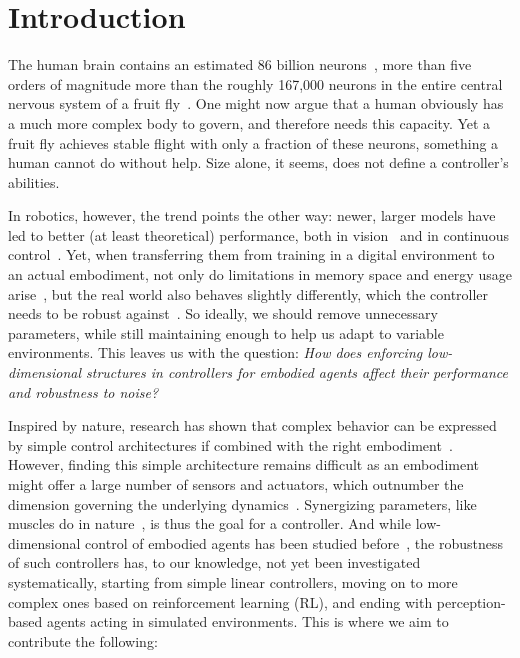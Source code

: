 \chapter{Introduction}
\label{chap:introduction}

The human brain contains an estimated 86 billion neurons~\cite{Azevedo2009Equal}, more than five orders of magnitude more
than the roughly 167,000 neurons in the entire central nervous system of a fruit fly~\cite{Berg2026Sexual}.
One might now argue that a human obviously has a much more complex body to govern, and therefore needs this capacity.
Yet a fruit fly achieves stable flight with only a fraction of these neurons, something a human cannot do without help. Size alone,
it seems, does not define a controller's abilities.

In robotics, however, the trend points the other way: newer, larger models have led to better (at least theoretical) performance,
both in vision~\cite{Dehghani2023Scaling} and in continuous control~\cite{Nauman2024Bigger,Lee2025SimBa}.
Yet, when transferring them from training in a digital environment to an actual embodiment, not only do limitations
in memory space and energy usage arise~\cite[p.~7]{Roy2021MachineLearning}, but the real world also behaves slightly differently, which the
controller needs to be robust against~\cite{Tobin2017Domain,Peng2018SimToReal}. So ideally, we should
remove unnecessary parameters, while still maintaining enough to help us adapt to variable environments. This leaves us with the question:
\emph{How does enforcing low-dimensional structures in controllers for embodied agents affect their performance and robustness to noise?}

Inspired by nature, research has shown that complex behavior can be expressed by simple control architectures if combined with
the right embodiment~\cite{McGeer1990Passive,Mueller2017Morphological}. However, finding this simple architecture remains difficult
as an embodiment might offer a large number of sensors and actuators, which outnumber the dimension governing the underlying dynamics~\cite{Todorov2002Optimal,Lesort2018State}.
Synergizing parameters, like muscles do in nature~\cite{DAvella2003Combinations}, is thus the goal for a controller.
And while low-dimensional control of embodied agents has been studied before~\cite{Montufar2015CheapControl,Datar2025Universal},
the robustness of such controllers has, to our knowledge, not yet been investigated systematically, starting from
simple linear controllers, moving on to more complex ones based on reinforcement learning (RL),
and ending with perception-based agents acting in simulated environments.
This is where we aim to contribute the following:

